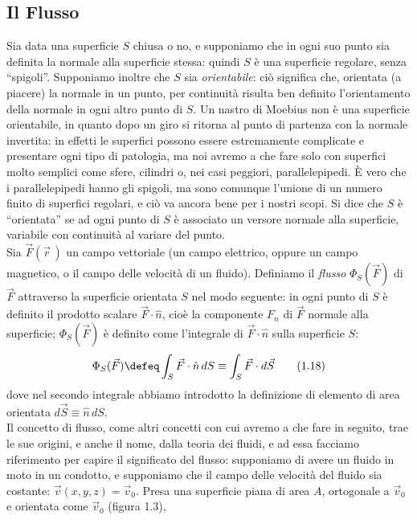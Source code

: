 \subsection{Il Flusso}

Sia data una superficie $S$ chiusa o no, e supponiamo che in ogni suo punto sia
definita la normale alla superficie stessa: quindi $S$ \`e una superficie
regolare, senza ``spigoli''. Supponiamo inoltre che $S$ sia \emph{orientabile}:
ci\`o significa che, orientata (a piacere) la normale in un punto, per
continuit\`a risulta ben definito l'orientamento della normale in ogni altro
punto di $S$. Un nastro di Moebius non \`e una superficie orientabile, in quanto
dopo un giro si ritorna al punto di partenza con la normale invertita: in
effetti le superfici possono essere estremamente complicate e presentare ogni
tipo di patologia, ma noi avremo a che fare solo con superfici molto semplici
come sfere, cilindri o, nei casi peggiori, parallelepipedi. \`E vero che i
parallelepipedi hanno gli spigoli, ma sono comunque l'unione di un numero finito
di superfici regolari, e ci\`o va ancora bene per i nostri scopi. Si dice che
$S$ \`e ``orientata'' se ad ogni punto di $S$ \`e associato un versore normale
alla superficie, variabile con continuit\`a al variare del punto.\\
Sia $\vec F(\vec r\,)$ un campo vettoriale (un campo elettrico, oppure un campo
magnetico, o il campo delle velocit\`a di un fluido). Definiamo il \emph{flusso}
$\Phi_S(\vec F)$ di $\vec F$ attraverso la superficie orientata $S$ nel modo
seguente: in ogni punto di $S$ \`e definito il prodotto scalare
$\vec F\cdot\hat n$, cio\`e la componente $F_n$ di $\vec F$ normale alla
superficie; $\Phi_S(\vec F)$ \`e definito come l'integrale di
$\vec F\cdot\hat n$ sulla superficie $S$:
\begin{equation}
  \Phi_S(\vec F)\defeq\int_S\vec F\cdot\hat n\,dS\equiv\int_S\vec F\cdot d\vec S
  \tag{1.18}
\end{equation}
dove nel secondo integrale abbiamo introdotto la definizione di elemento di area
orientata $d\vec S\equiv\hat n\,dS$.\\
Il concetto di flusso, come altri concetti con cui avremo a che fare in seguito,
trae le sue origini, e anche il nome, dalla teoria dei fluidi, e ad essa
facciamo riferimento per capire il significato del flusso: supponiamo di avere
un fluido in moto in un condotto, e supponiamo che il campo delle velocit\`a del
fluido sia costante: $\vec v(x,y,z)=\vec v_0$. Presa una superficie piana di
area $A$, ortogonale a $\vec v_0$ e orientata come $\vec v_0$ (figura 1.3),
